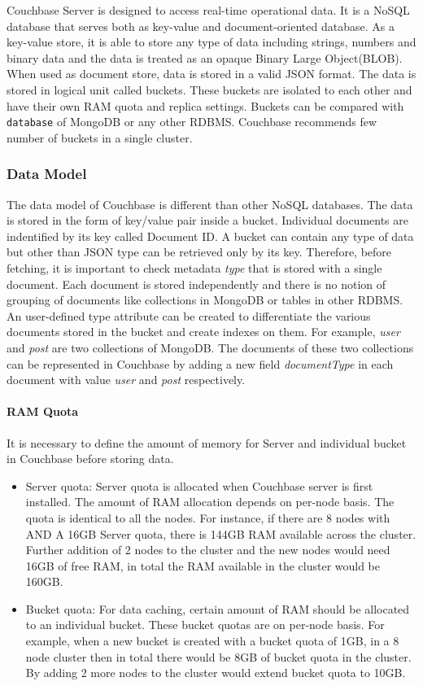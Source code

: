  Couchbase Server is designed to access real-time operational data. It is a NoSQL database that serves both as key-value and document-oriented database. As a key-value store, it is able to store any type of data including  strings, numbers and binary data and the data is treated as an opaque Binary Large Object(BLOB). When used as document store, data is stored in a valid JSON format. The data is stored in logical unit called buckets. These buckets are isolated to each other and have their own RAM quota and replica settings. Buckets can be compared with \texttt{database} of MongoDB or any other RDBMS. Couchbase recommends few number of buckets in a single cluster.
 
 \subsubsection{Data Model}%
 
The data model of Couchbase is different than other NoSQL databases. The data is stored in the form of key/value pair inside a bucket. Individual documents are indentified by its key called Document ID. A bucket can contain any type of data but other than JSON type can be retrieved only by its key. Therefore, before fetching, it is important to check metadata \textit{type} that is stored with a single document. Each document is stored independently and there is no notion of grouping of documents like collections in MongoDB or tables in other RDBMS. An user-defined type attribute can be created to differentiate the various documents stored in the bucket and  create indexes on them.  For example, \textit{user} and \textit{post} are two collections of MongoDB. The documents of these two collections can be represented in Couchbase by adding a new field \textit{documentType}  in each document with value \textit{user} and \textit{post} respectively. 

\paragraph{RAM Quota}
It is necessary to define the amount of memory for Server and individual bucket in Couchbase before storing data. 
\begin{itemize}
\item {Server quota:}
          Server quota is allocated when Couchbase server is first installed. The amount of RAM allocation depends on per-node basis. The quota is identical to all the nodes. For instance, if there are 8 nodes with AND A 16GB Server quota, there is 144GB RAM available across the cluster. Further addition of 2 nodes to the cluster and the new nodes would need 16GB of free RAM, in total the RAM available in the cluster would be 160GB.   
\item{Bucket quota:}    
For data caching, certain amount of RAM should be allocated to an individual bucket. These bucket quotas are on per-node basis. For example, when a new bucket is created with a bucket quota of 1GB, in a 8 node cluster then in total there would be 8GB of bucket quota in the cluster. By adding 2 more nodes to the cluster would extend bucket quota to 10GB. 
\end{itemize}
           
